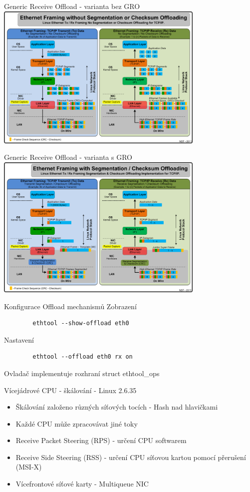 \documentclass{beamer}
\begin{document}
\begin{frame}{Generic Receive Offload - varianta bez GRO}
	\centering
	\includegraphics[width=10cm,keepaspectratio]{fig/no_segmentation_offloading.png}
\end{frame}

\begin{frame}{Generic Receive Offload - varianta s GRO}
	\centering
	\includegraphics[width=10cm,keepaspectratio]{fig/segmentation_offloading.png}
\end{frame}

\begin{frame}[fragile]{Konfigurace Offload mechanismů}
	Zobrazení
	\begin{lstlisting}
		ethtool --show-offload eth0
	\end{lstlisting}
	Nastavení
	\begin{lstlisting}
		ethtool --offload eth0 rx on
	\end{lstlisting}
	Ovladač implementuje rozhraní struct ethtool\_ops
\end{frame}


\begin{frame}{Vícejádrové CPU - škálování - Linux 2.6.35}
	\begin{itemize}
		\item Škálování založeno různých síťových tocích - Hash nad hlavičkami
		\item Každé CPU může zpracovávat jiné toky
		\item Receive Packet Steering (RPS) - určení CPU softwarem
		\item Receive Side Steering (RSS) - určení CPU síťovou kartou pomocí přerušení (MSI-X)
		\item Vícefrontové síťové karty - Multiqueue NIC
	\end{itemize}
\end{frame}
\end{document}
